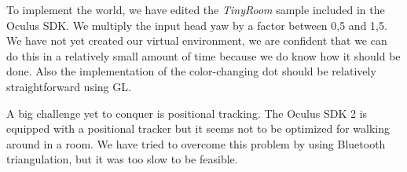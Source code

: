 To implement the world, we have edited the \textit{TinyRoom} sample included in the Oculus SDK. 
We multiply the input head yaw by a factor between 0,5 and 1,5.
We have not yet created our virtual environment, we are confident that we can do this in a relatively small amount of time because we do know how it should be done.
Also the implementation of the color-changing dot should be relatively straightforward using GL.

A big challenge yet to conquer is positional tracking.
The Oculus SDK 2 is equipped with a positional tracker but it seems not to be optimized for walking around in a room.
We have tried to overcome this problem by using Bluetooth triangulation, but it was too slow to be feasible.


